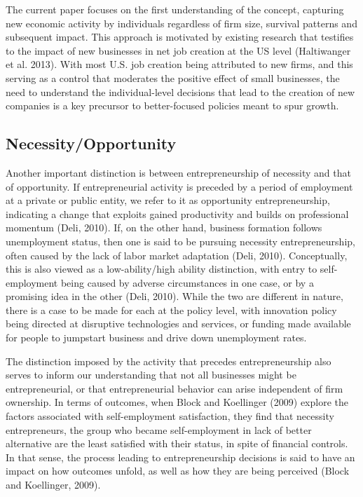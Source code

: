 The current paper focuses on the first understanding of the concept, capturing new economic activity by individuals regardless of firm size, survival patterns and subsequent impact. This approach is motivated by existing research that testifies to the impact of new businesses in net job creation at the US level (Haltiwanger et al. 2013). With most U.S. job creation being attributed to new firms, and this serving as a control that moderates the positive effect of small businesses, the need to understand the individual-level decisions that lead to the creation of new companies is a key precursor to better-focused policies meant to spur growth.

\subsection{Necessity/Opportunity}

Another important distinction is between entrepreneurship of necessity and that of opportunity. If entrepreneurial activity is preceded by a period of employment at a private or public entity, we refer to it as opportunity entrepreneurship, indicating a change that exploits gained productivity and builds on professional momentum (Deli, 2010). If, on the other hand, business formation follows unemployment status, then one is said to be pursuing necessity entrepreneurship, often caused by the lack of labor market adaptation (Deli, 2010). Conceptually, this is also viewed as a low-ability/high ability distinction, with entry to self-employment being caused by adverse circumstances in one case, or by a promising idea in the other (Deli, 2010). While the two are different in nature, there is a case to be made for each at the policy level, with innovation policy being directed at disruptive technologies and services, or funding made available for people to jumpstart business and drive down unemployment rates. 

The distinction imposed by the activity that precedes entrepreneurship also serves to inform our understanding that not all businesses might be entrepreneurial, or that entrepreneurial behavior can arise independent of firm ownership. In terms of outcomes, when Block and Koellinger (2009) explore the factors associated with self-employment satisfaction, they find that necessity entrepreneurs, the group who became self-employment in lack of better alternative are the least satisfied with their status, in spite of financial controls. In that sense, the process leading to entrepreneurship decisions is said to have an impact on how outcomes unfold, as well as how they are being perceived  (Block and Koellinger, 2009).

